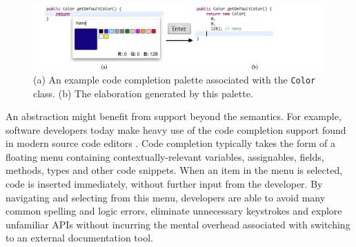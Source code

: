 \begin{figure}[h]\label{color}
\begin{center}
\includegraphics[width=40pc]{color_palette.png}\end{center}
\caption{(a) An example code completion palette associated with the \texttt{Color} class. (b) The elaboration generated by this palette.}
\label{colorpalette}
\end{figure}

\noindent
An abstraction might benefit from support beyond the semantics. For example, software developers today make heavy use of the code completion support found in modern source code editors  \cite{murphy_how_2006}. Code completion typically takes the form of a floating menu containing  contextually-relevant variables, assignables, fields, methods, types and other code snippets. When an item in the menu is selected, code is inserted immediately, without further input from the developer.  By navigating and selecting from this menu, developers are able to avoid many common spelling and logic errors, eliminate unnecessary keystrokes and explore unfamiliar APIs without incurring the mental overhead associated with switching to an external documentation tool.

